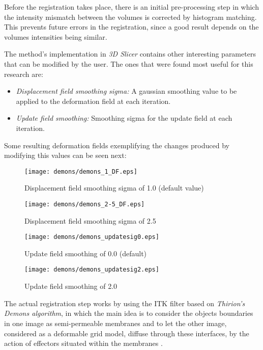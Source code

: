 Before the registration takes place, there is an initial
pre-processing step in which the intensity mismatch between the
volumes is corrected by histogram matching. This prevents future
errors in the registration, since a good result depends on the volumes
intensities being similar.

The method's implementation in \textit{3D Slicer} contains other
interesting parameters that can be modified by the user. The ones that
were found most useful for this research are:
\begin{itemize}
\item \textit{Displacement field smoothing sigma:} A gaussian
  smoothing value to be applied to the deformation field at each
  iteration.
\item \textit{Update field smoothing:} Smoothing sigma for the update
  field at each iteration.
\end{itemize}

Some resulting deformation fields exemplifying the changes produced by
modifying this values can be seen next:

\begin{figure}[H]
  \centering
  \texttt{[image: demons/demons\_1\_DF.eps]}
  \caption{Displacement field smoothing sigma of 1.0 (default value)}
  \label{df_1}
\end{figure}

\begin{figure}[H]
  \centering
  \texttt{[image: demons/demons\_2-5\_DF.eps]}
  \caption{Displacement field smoothing sigma of 2.5}
  \label{df_2}
\end{figure}

\begin{figure}[H]
  \centering
  \texttt{[image: demons/demons\_updatesig0.eps]}
  \caption{Update field smoothing of 0.0 (default)}
  \label{uf_0}
\end{figure}

\begin{figure}[H]
  \centering
  \texttt{[image: demons/demons\_updatesig2.eps]}
  \caption{Update field smoothing of 2.0}
  \label{uf_2}
\end{figure}

The actual registration step works by using the ITK filter based on
\textit{Thirion's Demons algorithm}, in which the main idea is to
consider the objects boundaries in one image as semi-permeable
membranes and to let the other image, considered as a deformable grid
model, diffuse through these interfaces, by the action of effectors
situated within the membranes \cite{thirion}.

